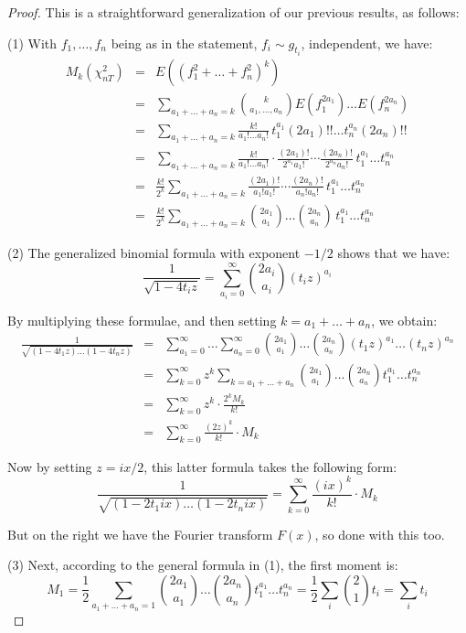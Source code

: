 \documentclass[12pt]{amsbook}
\begin{document}
\begin{proof}
This is a straightforward generalization of our previous results, as follows:

\medskip

(1) With $f_1,\ldots,f_n$ being as in the statement, $f_i\sim g_{t_i}$, independent, we have:
\begin{eqnarray*}
M_k(\chi_{nT}^2)
&=&E((f_1^2+\ldots+f_n^2)^k)\\
&=&\sum_{a_1+\ldots+a_n=k}\binom{k}{a_1,\ldots,a_n}E(f_1^{2a_1})\ldots E(f_n^{2a_n})\\
&=&\sum_{a_1+\ldots+a_n=k}\frac{k!}{a_1!\ldots a_n!}\,t_1^{a_1}(2a_1)!!\ldots t_n^{a_n}(2a_n)!!\\
&=&\sum_{a_1+\ldots+a_n=k}\frac{k!}{a_1!\ldots a_n!}\cdot\frac{(2a_1)!}{2^{a_1}a_1!}\cdots\frac{(2a_n)!}{2^{a_n}a_n!}\,t_1^{a_1}\ldots t_n^{a_n}\\
&=&\frac{k!}{2^k}\sum_{a_1+\ldots+a_n=k}\frac{(2a_1)!}{a_1!a_1!}\cdots\frac{(2a_n)!}{a_n!a_n!}\,t_1^{a_1}\ldots t_n^{a_n}\\
&=&\frac{k!}{2^k}\sum_{a_1+\ldots+a_n=k}\binom{2a_1}{a_1}\ldots\binom{2a_n}{a_n}\,t_1^{a_1}\ldots t_n^{a_n}
\end{eqnarray*}

(2) The generalized binomial formula with exponent $-1/2$ shows that we have:
$$\frac{1}{\sqrt{1-4t_iz}}=\sum_{a_i=0}^\infty\binom{2a_i}{a_i}(t_iz)^{a_i}$$

By multiplying these formulae, and then setting $k=a_1+\ldots+a_n$, we obtain:
\begin{eqnarray*}
\frac{1}{\sqrt{(1-4t_1z)\ldots(1-4t_nz)}}
&=&\sum_{a_1=0}^\infty\ldots\sum_{a_n=0}^\infty\binom{2a_1}{a_1}\ldots\binom{2a_n}{a_n}(t_1z)^{a_1}\ldots(t_nz)^{a_n}\\
&=&\sum_{k=0}^\infty z^k\sum_{k=a_1+\ldots+a_n}\binom{2a_1}{a_1}\ldots\binom{2a_n}{a_n}t_1^{a_1}\ldots t_n^{a_n}\\
&=&\sum_{k=0}^\infty z^k\cdot\frac{2^kM_k}{k!}\\
&=&\sum_{k=0}^\infty\frac{(2z)^k}{k!}\cdot M_k
\end{eqnarray*}

Now by setting $z=ix/2$, this latter formula takes the following form:
$$\frac{1}{\sqrt{(1-2t_1ix)\ldots(1-2t_nix)}}=\sum_{k=0}^\infty\frac{(ix)^k}{k!}\cdot M_k$$

But on the right we have the Fourier transform $F(x)$, so done with this too.

\medskip

(3) Next, according to the general formula in (1), the first moment is:
$$M_1
=\frac{1}{2}\sum_{a_1+\ldots+a_n=1}\binom{2a_1}{a_1}\ldots\binom{2a_n}{a_n}t_1^{a_1}\ldots t_n^{a_n}
=\frac{1}{2}\sum_i\binom{2}{1}t_i
=\sum_it_i$$


\end{proof}
\end{document}
